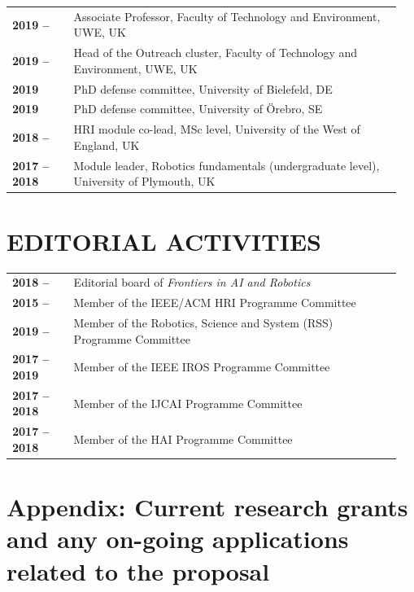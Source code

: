 \documentclass[11pt,a4paper]{report}
\begin{document}
\begin{tabular}{p{0.15\linewidth}p{0.8\linewidth}}
    \bf 2019 -- & Associate Professor, Faculty of Technology and Environment, UWE, UK \\
    \bf 2019 -- & Head of the Outreach cluster, Faculty of Technology and Environment, UWE, UK \\
    \bf 2019 & PhD defense committee, University of Bielefeld, DE \\
    \bf 2019 & PhD defense committee, University of Örebro, SE \\
    \bf 2018 -- & HRI module co-lead, MSc level, University of the West of England, UK  \\
    \bf 2017 -- 2018 & Module leader, Robotics fundamentals (undergraduate level), University of Plymouth, UK \\
\end{tabular}

\section{EDITORIAL ACTIVITIES}

\begin{tabular}{p{0.15\linewidth}p{0.8\linewidth}}
    \bf 2018 -- & Editorial board of \emph{Frontiers in AI and Robotics} \\
    \bf 2015 --  & Member of the IEEE/ACM HRI Programme Committee \\
    \bf 2019 --  & Member of the Robotics, Science and System (RSS) Programme Committee  \\
    \bf 2017 -- 2019 & Member of the IEEE IROS Programme Committee  \\
    \bf 2017 -- 2018 & Member of the IJCAI Programme Committee  \\
    \bf 2017 -- 2018 & Member of the HAI Programme Committee  \\
\end{tabular}




\newpage

\section{Appendix: Current research grants and any on-going applications related
to the proposal}
\end{document}

